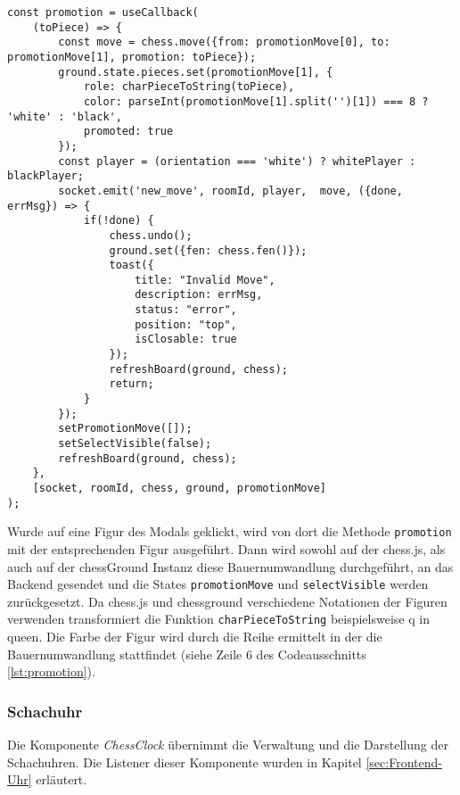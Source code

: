 \begin{lstlisting}[style=codeStyle, caption={Die promotion Methode}, label={lst:promotion}]
const promotion = useCallback(
    (toPiece) => {
        const move = chess.move({from: promotionMove[0], to: promotionMove[1], promotion: toPiece});
        ground.state.pieces.set(promotionMove[1], {
            role: charPieceToString(toPiece),
            color: parseInt(promotionMove[1].split('')[1]) === 8 ? 'white' : 'black',
            promoted: true
        });
        const player = (orientation === 'white') ? whitePlayer : blackPlayer;
        socket.emit('new_move', roomId, player,  move, ({done, errMsg}) => {
            if(!done) {
                chess.undo();
                ground.set({fen: chess.fen()});
                toast({
                    title: "Invalid Move",
                    description: errMsg,
                    status: "error",
                    position: "top",
                    isClosable: true
                });
                refreshBoard(ground, chess);
                return;
            }
        });
        setPromotionMove([]);
        setSelectVisible(false);
        refreshBoard(ground, chess);
    },
    [socket, roomId, chess, ground, promotionMove]
);
\end{lstlisting}

Wurde auf eine Figur des Modals geklickt, wird von dort die Methode \verb|promotion| mit der entsprechenden Figur ausgeführt. Dann wird sowohl auf der chess.js, als auch auf der chessGround Instanz diese Bauernumwandlung durchgeführt, an das Backend gesendet und die States \verb|promotionMove| und \verb|selectVisible| werden zurückgesetzt. Da chess.js und chessground verschiedene Notationen der Figuren verwenden transformiert die Funktion \verb|charPieceToString| beispielsweise \glqq q\grqq{ } in \glqq queen\grqq . Die Farbe der Figur wird durch die Reihe ermittelt in der die Bauernumwandlung stattfindet (siehe Zeile 6 des Codeausschnitts \ref{lst:promotion}).

\subsubsection{Schachuhr}
\label{sec:impl-schachuhr}
Die Komponente \textit{ChessClock} übernimmt die Verwaltung und die Darstellung der Schachuhren. Die Listener dieser Komponente wurden in Kapitel \ref{sec:Frontend-Uhr} erläutert.

